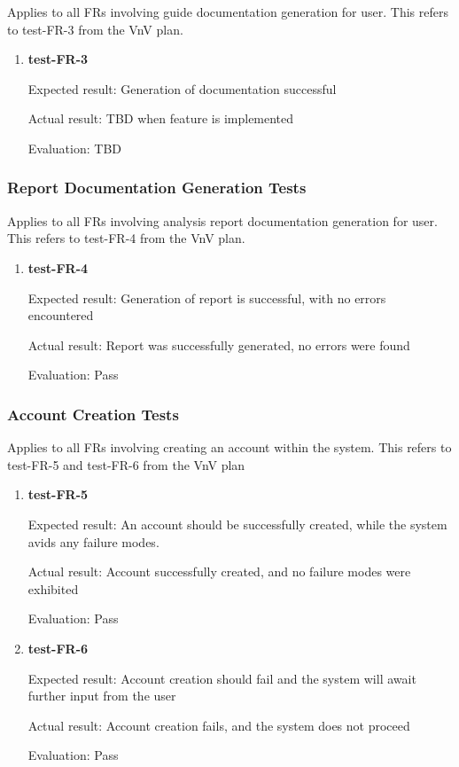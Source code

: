 \documentclass[12pt, titlepage]{article}
\begin{document}
Applies to all FRs involving guide documentation generation for user. This
refers to test-FR-3 from the VnV plan.

\begin{enumerate}

\item{\textbf{test-FR-3}}

Expected result: Generation of documentation successful

Actual result: TBD when feature is implemented

Evaluation: TBD

\end{enumerate}

\subsubsection{Report Documentation Generation Tests}

Applies to all FRs involving analysis report documentation generation for 
user. This refers to test-FR-4 from the VnV plan.

\begin{enumerate}

\item{\textbf{test-FR-4}}	

Expected result: Generation of report is successful, with no errors encountered

Actual result: Report was successfully generated, no errors were found

Evaluation: Pass

\end{enumerate}

\subsubsection{Account Creation Tests}

Applies to all FRs involving creating an account within the system. This refers
to test-FR-5 and test-FR-6 from the VnV plan
\begin{enumerate}

\item{\textbf{test-FR-5}}

Expected result: An account should be successfully created, while the system avids any failure modes.

Actual result: Account successfully created, and no failure modes were exhibited

Evaluation: Pass

\item{\textbf{test-FR-6}}
		
Expected result: Account creation should fail and the system will await further input from the user

Actual result: Account creation fails, and the system does not proceed

Evaluation: Pass 

\end{enumerate}
\end{document}
